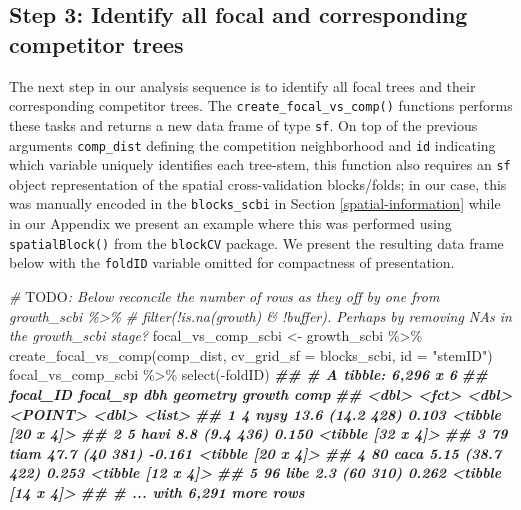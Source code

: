 \documentclass[12pt]{article}
\newenvironment{Shaded}{\begin{snugshade}}{\end{snugshade}}
\newcommand{\AlertTok}[1]{\textcolor[rgb]{0.94,0.16,0.16}{#1}}
\newcommand{\AttributeTok}[1]{\textcolor[rgb]{0.77,0.63,0.00}{#1}}
\newcommand{\CommentTok}[1]{\textcolor[rgb]{0.56,0.35,0.01}{\textit{#1}}}
\newcommand{\DocumentationTok}[1]{\textcolor[rgb]{0.56,0.35,0.01}{\textbf{\textit{#1}}}}
\newcommand{\FunctionTok}[1]{\textcolor[rgb]{0.00,0.00,0.00}{#1}}
\newcommand{\NormalTok}[1]{#1}
\newcommand{\OtherTok}[1]{\textcolor[rgb]{0.56,0.35,0.01}{#1}}
\newcommand{\SpecialCharTok}[1]{\textcolor[rgb]{0.00,0.00,0.00}{#1}}
\newcommand{\StringTok}[1]{\textcolor[rgb]{0.31,0.60,0.02}{#1}}
\begin{document}
\hypertarget{focal-vs-comp}{%
\subsection{Step 3: Identify all focal and corresponding competitor
trees}\label{focal-vs-comp}}

The next step in our analysis sequence is to identify all focal trees
and their corresponding competitor trees. The
\texttt{create\_focal\_vs\_comp()} functions performs these tasks and
returns a new data frame of type \texttt{sf}. On top of the previous
arguments \texttt{comp\_dist} defining the competition neighborhood and
\texttt{id} indicating which variable uniquely identifies each
tree-stem, this function also requires an \texttt{sf} object
representation of the spatial cross-validation blocks/folds; in our
case, this was manually encoded in the \texttt{blocks\_scbi} in Section
\ref{spatial-information} while in our Appendix we present an example
where this was performed using \texttt{spatialBlock()} from the
\texttt{blockCV} package. We present the resulting data frame below with
the \texttt{foldID} variable omitted for compactness of presentation.

\begin{Shaded}
\begin{Highlighting}[]
\CommentTok{\# }\AlertTok{TODO}\CommentTok{: Below reconcile the number of rows as they off by one from growth\_scbi \%\textgreater{}\% }
\CommentTok{\# filter(!is.na(growth) \& !buffer). Perhaps by removing NA\textquotesingle{}s in the growth\_scbi stage?}
\NormalTok{focal\_vs\_comp\_scbi }\OtherTok{\textless{}{-}}\NormalTok{ growth\_scbi }\SpecialCharTok{\%\textgreater{}\%}
  \FunctionTok{create\_focal\_vs\_comp}\NormalTok{(comp\_dist, }\AttributeTok{cv\_grid\_sf =}\NormalTok{ blocks\_scbi, }\AttributeTok{id =} \StringTok{"stemID"}\NormalTok{)}
\NormalTok{focal\_vs\_comp\_scbi }\SpecialCharTok{\%\textgreater{}\%} 
  \FunctionTok{select}\NormalTok{(}\SpecialCharTok{{-}}\NormalTok{foldID)}
\DocumentationTok{\#\# \# A tibble: 6,296 x 6}
\DocumentationTok{\#\#   focal\_ID focal\_sp   dbh   geometry growth comp             }
\DocumentationTok{\#\#      \textless{}dbl\textgreater{} \textless{}fct\textgreater{}    \textless{}dbl\textgreater{}    \textless{}POINT\textgreater{}  \textless{}dbl\textgreater{} \textless{}list\textgreater{}           }
\DocumentationTok{\#\# 1        4 nysy     13.6  (14.2 428)  0.103 \textless{}tibble [20 x 4]\textgreater{}}
\DocumentationTok{\#\# 2        5 havi      8.8   (9.4 436)  0.150 \textless{}tibble [32 x 4]\textgreater{}}
\DocumentationTok{\#\# 3       79 tiam     47.7    (40 381) {-}0.161 \textless{}tibble [20 x 4]\textgreater{}}
\DocumentationTok{\#\# 4       80 caca      5.15 (38.7 422)  0.253 \textless{}tibble [12 x 4]\textgreater{}}
\DocumentationTok{\#\# 5       96 libe      2.3    (60 310)  0.262 \textless{}tibble [14 x 4]\textgreater{}}
\DocumentationTok{\#\# \# ... with 6,291 more rows}
\end{Highlighting}
\end{Shaded}
\end{document}
